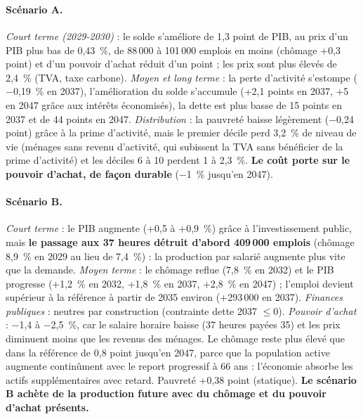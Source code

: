 \begin{table}[p]
\centering\scriptsize
\caption{Scénario A — redressement budgétaire prioritaire (modèle complet).}\label{tab:scA}
\\[10pt]
\caption{Scénario B — croissance et réindustrialisation prioritaires.}\label{tab:scB}
\end{table}

\begin{table}[p]
\centering\scriptsize
\caption{Scénario C — redressement équilibré.}\label{tab:scC}
\\[10pt]
\caption{Scénario D — effort maximal sur la dette.}\label{tab:scD}
\end{table}

\paragraph{Scénario A.} \emph{Court terme (2029-2030)} : le solde s'améliore de 1,3 point de PIB, au prix d'un PIB plus
bas de 0,43~\%, de 88\,000 à 101\,000 emplois en moins (chômage +0,3 point) et d'un pouvoir d'achat réduit d'un point ;
les prix sont plus élevés de 2,4~\% (TVA, taxe carbone). \emph{Moyen et long terme} : la perte d'activité s'estompe
($-$0,19~\% en 2037), l'amélioration du solde s'accumule (+2,1 points en 2037, +5 en 2047 grâce aux intérêts
économisés), la dette est plus basse de 15 points en 2037 et de 44 points en 2047. \emph{Distribution} : la pauvreté
baisse légèrement ($-$0,24 point) grâce à la prime d'activité, mais le premier décile perd 3,2~\% de niveau de vie (ménages
sans revenu d'activité, qui subissent la TVA sans bénéficier de la prime d'activité) et les déciles 6 à 10 perdent 1 à
2,3~\%. \textbf{Le coût porte sur le pouvoir d'achat, de façon durable} ($-$1~\% jusqu'en 2047).

\paragraph{Scénario B.} \emph{Court terme} : le PIB augmente (+0,5 à +0,9~\%) grâce à l'investissement public, mais
\textbf{le passage aux 37 heures détruit d'abord 409\,000 emplois} (chômage 8,9~\% en 2029 au lieu de 7,4~\%) : la
production par salarié augmente plus vite que la demande. \emph{Moyen terme} : le chômage reflue (7,8~\% en 2032) et le PIB
progresse (+1,2~\% en 2032, +1,8~\% en 2037, +2,8~\% en 2047) ; l'emploi devient supérieur à la référence à partir de
2035 environ (+293\,000 en 2037). \emph{Finances publiques} : neutres par construction (contrainte dette 2037 $\leq 0$).
\emph{Pouvoir d'achat} : $-$1,4 à $-$2,5~\%, car le salaire horaire baisse (37 heures payées 35) et les prix diminuent moins
que les revenus des ménages. Le chômage reste plus élevé que dans la référence de 0,8 point jusqu'en 2047, parce que la
population active augmente continûment avec le report progressif à 66 ans : l'économie absorbe les actifs supplémentaires
avec retard. Pauvreté +0,38 point (statique). \textbf{Le scénario B achète de la production future avec du chômage et
du pouvoir d'achat présents.}

